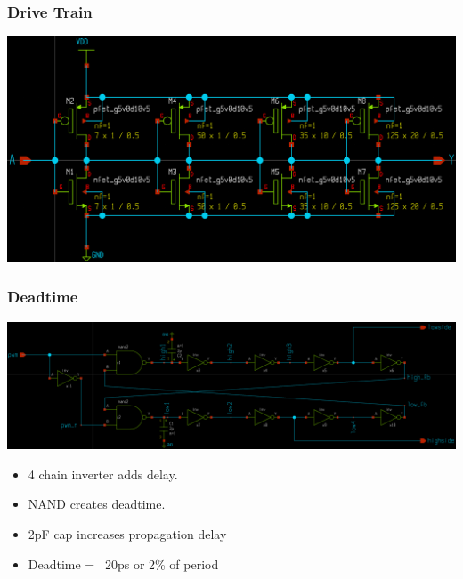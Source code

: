 \documentclass{beamer}
\begin{document}
\begin{frame}
  \frametitle{Drive Train}
  \includegraphics[scale=0.08]{drive-train.png}
\end{frame}

\begin{frame}
  \frametitle{Deadtime}
  \includegraphics[scale=0.085]{deadtime.png}
  \begin{itemize}
  \item 4 chain inverter adds delay.
  \item NAND creates deadtime.
  \item 2pF cap increases propagation delay
  \item Deadtime = ~20ps or 2\%  of period
  \end{itemize}
\end{frame}
\end{document}
